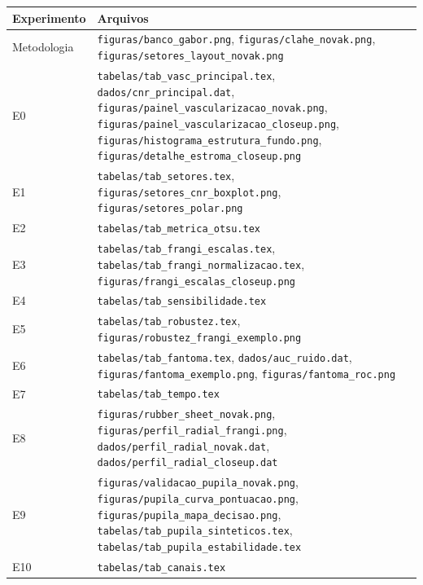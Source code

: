 \documentclass[12pt, oneside, a4paper, chapter=TITLE, section=TITLE,
               english, brazil]{abntex2}
\newcommand{\arq}[1]{\nolinkurl{#1}}
\begin{document}
\begin{apendicesenv}
\begin{quadro}[htbp]
  \caption{Arquivos gerados por experimento no diretório
  \arq{docs/PGC_2}}
  \label{qua:arquivos}
  \footnotesize
  \renewcommand{\arraystretch}{1.15}
  \begin{tabular}{|>{\raggedright\arraybackslash}p{2.0cm}
                  |>{\raggedright\arraybackslash}p{12.2cm}|}
    \hline
    \textbf{Experimento} & \textbf{Arquivos} \\ \hline
    Metodologia & \arq{figuras/banco_gabor.png}, \arq{figuras/clahe_novak.png},
      \arq{figuras/setores_layout_novak.png} \\ \hline
    E0 & \arq{tabelas/tab_vasc_principal.tex}, \arq{dados/cnr_principal.dat},
      \arq{figuras/painel_vascularizacao_novak.png},
      \arq{figuras/painel_vascularizacao_closeup.png},
      \arq{figuras/histograma_estrutura_fundo.png},
      \arq{figuras/detalhe_estroma_closeup.png} \\ \hline
    E1 & \arq{tabelas/tab_setores.tex}, \arq{figuras/setores_cnr_boxplot.png},
      \arq{figuras/setores_polar.png} \\ \hline
    E2 & \arq{tabelas/tab_metrica_otsu.tex} \\ \hline
    E3 & \arq{tabelas/tab_frangi_escalas.tex},
      \arq{tabelas/tab_frangi_normalizacao.tex},
      \arq{figuras/frangi_escalas_closeup.png} \\ \hline
    E4 & \arq{tabelas/tab_sensibilidade.tex} \\ \hline
    E5 & \arq{tabelas/tab_robustez.tex}, \arq{figuras/robustez_frangi_exemplo.png} \\ \hline
    E6 & \arq{tabelas/tab_fantoma.tex}, \arq{dados/auc_ruido.dat},
      \arq{figuras/fantoma_exemplo.png}, \arq{figuras/fantoma_roc.png} \\ \hline
    E7 & \arq{tabelas/tab_tempo.tex} \\ \hline
    E8 & \arq{figuras/rubber_sheet_novak.png}, \arq{figuras/perfil_radial_frangi.png},
      \arq{dados/perfil_radial_novak.dat}, \arq{dados/perfil_radial_closeup.dat} \\ \hline
    E9 & \arq{figuras/validacao_pupila_novak.png},
      \arq{figuras/pupila_curva_pontuacao.png},
      \arq{figuras/pupila_mapa_decisao.png},
      \arq{tabelas/tab_pupila_sinteticos.tex},
      \arq{tabelas/tab_pupila_estabilidade.tex} \\ \hline
    E10 & \arq{tabelas/tab_canais.tex} \\ \hline
  \end{tabular}
\end{quadro}


\end{apendicesenv}
\end{document}

